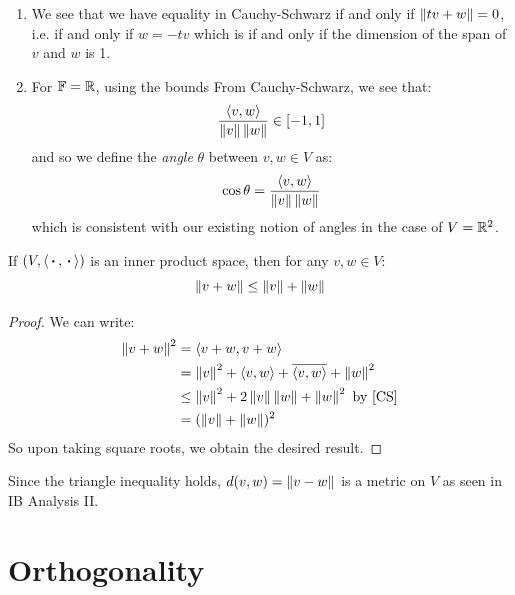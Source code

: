\documentclass[../main.tex]{subfiles}
\begin{document}
\begin{remark}[Remarks]
  \begin{enumerate}
    \item We see that we have equality in Cauchy-Schwarz if and only if $\left\lVert tv + w \right\rVert = 0$, i.e. if and only if $w = - tv$ which is if and only if the dimension of the span of $v$ and $w$ is 1.
    \item For $\mathbb{F} = \mathbb{R}$, using the bounds From Cauchy-Schwarz, we see that:
      \[
        \frac{\langle v, w \rangle}{\left\lVert v \right\rVert \left\lVert w \right\rVert} \in [-1, 1]
      \]
      and so we define the \textit{angle} $\theta$ between $v, w \in V$ as:
      \[
        \cos \theta = \frac{\langle v, w \rangle}{\left\lVert v \right\rVert\left\lVert w \right\rVert}
      \]
      which is consistent with our existing notion of angles in the case of $V = \mathbb{R}^2$.
  \end{enumerate}
\end{remark}
\begin{corollary}
  If $(V, \langle {\hspace{0.18em}\boldsymbol{\cdot}\hspace{0.18em}}, {\hspace{0.18em}\boldsymbol{\cdot}\hspace{0.18em}} \rangle)$ is an inner product space, then for any $v, w \in V$:
  \[
    \left\lVert v + w \right\rVert \leq \left\lVert v \right\rVert + \left\lVert w \right\rVert
  \]
\end{corollary}
\begin{proof}
  We can write:
  \begin{align*}
    \norm{v + w}^2 &= \langle v + w, v + w \rangle \\
                   &= \norm{v}^2 + \langle v, w \rangle + \overline{\langle v, w \rangle} + \norm{w}^2 \\
                   &\leq \norm{v}^2 + 2 \norm{v} \norm{w} + \norm{w}^2 \text{ by \cref{CS}} \\
                   &= (\norm{v} + \norm{w})^2
  \end{align*}
  So upon taking square roots, we obtain the desired result.
\end{proof}
\begin{remark}
  Since the triangle inequality holds, $d(v, w) = \left\lVert v - w \right\rVert$ is a metric on $V$ as seen in IB Analysis II.
\end{remark}
\section{Orthogonality}
\end{document}

